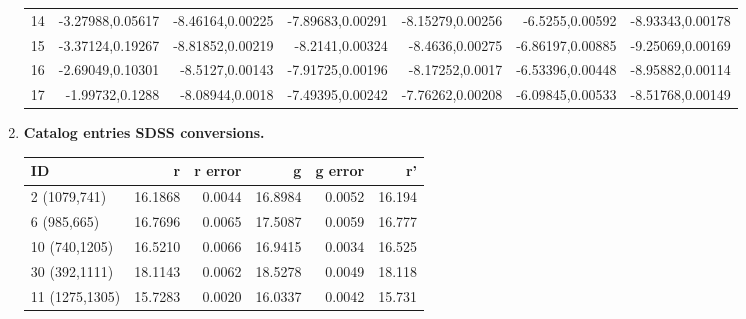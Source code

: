 \documentclass{article}
\begin{document}
\begin{enumerate}
\begin{table} [h]
\begin{tabular} {l r r r r r r}
				14 & -3.27988,0.05617 & -8.46164,0.00225 & -7.89683,0.00291 & -8.15279,0.00256 & -6.5255,0.00592 & -8.93343,0.00178 \\
				15 & -3.37124,0.19267 & -8.81852,0.00219 & -8.2141,0.00324 & -8.4636,0.00275 & -6.86197,0.00885 & -9.25069,0.00169 \\
				16 & -2.69049,0.10301 & -8.5127,0.00143 & -7.91725,0.00196 & -8.17252,0.0017 & -6.53396,0.00448 & -8.95882,0.00114 \\
				17 & -1.99732,0.1288 & -8.08944,0.0018 & -7.49395,0.00242 & -7.76262,0.00208 & -6.09845,0.00533 & -8.51768,0.00149 \\
				\bottomrule
			\end{tabular}
		\end{table}
	
		\item \textbf{Catalog entries SDSS conversions.}
		\begin{table} [h]
			\centering
			\begin{tabular} {l r r r r r}
				\toprule
				\textbf{ID} & \textbf{r} & \textbf{r error} & \textbf{g} & \textbf{g error} & \textbf{r'} \\
				\midrule
				2 (1079,741) & 16.1868 & 0.0044 & 16.8984 & 0.0052 & 16.194 \\
				6 (985,665) & 16.7696 & 0.0065 & 17.5087 & 0.0059 & 16.777 \\
				10 (740,1205) & 16.5210 & 0.0066 & 16.9415 & 0.0034 & 16.525 \\
				30 (392,1111) & 18.1143 & 0.0062 & 18.5278 & 0.0049 & 18.118\\
				11 (1275,1305)& 15.7283 & 0.0020 & 16.0337 & 0.0042 & 15.731 \\
				\bottomrule
			\end{tabular}
		\end{table}
	

\end{enumerate}
\end{document}
